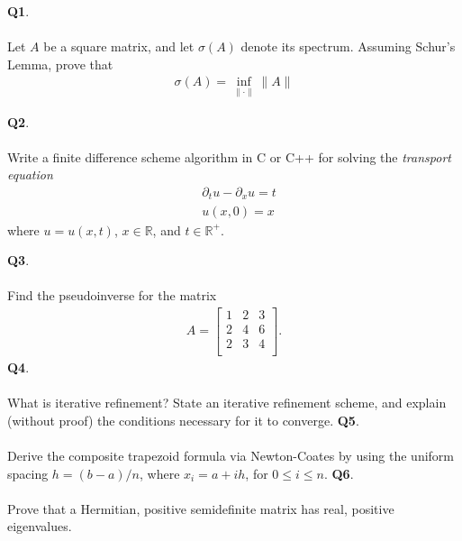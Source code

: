 \documentclass[12pt, oneside]{amsart}
\newcommand{\p}{\partial}
\newcommand{\rr}{\mathbb{R}}
\begin{document}
\vfill


\newpage
\noindent
\textbf{Q1}. \\ \\ 
Let $A$ be a square matrix, and let $\sigma(A)$ denote its spectrum.
Assuming Schur's Lemma, prove that
\begin{align*}
\sigma(A) = \inf_{\| \cdot \|} \| A \|
\end{align*}

\newpage

\noindent
\textbf{Q2}.\\ \\ 
Write a finite difference scheme algorithm in C or C++ for solving the
\emph{transport equation}
\begin{align*}
& \p_t u - \p_x u = t
\\
& u(x,0) = x
\end{align*}
where $u = u(x,t)$, $x \in \rr$, and $t \in \rr^{+}$.
\newpage

\noindent
\textbf{Q3}. \\ \\ 
Find the pseudoinverse for the matrix
\begin{align*}
A = 
\begin{bmatrix}
1 & 2 & 3\\
2 & 4 & 6 \\
2 & 3 & 4 \\
\end{bmatrix}.
\end{align*}
\newpage
\noindent
\textbf{Q4}. \\ \\ 
What is iterative refinement? State an iterative refinement scheme, and explain
(without proof) the conditions necessary for it to converge. 
\newpage
\noindent \textbf{Q5}. \\ \\ 
\noindent
Derive the composite trapezoid formula via Newton-Coates by using
the uniform spacing $h = (b-a)/n$, where $x_i = a + ih$, for $0 \le i \le n$.
\vspace{2in}
\newpage
\noindent \textbf{Q6}. \\ \\ 
\noindent
Prove that a Hermitian, positive semidefinite matrix has real, positive
eigenvalues.
\vspace{2in}
\end{document}
